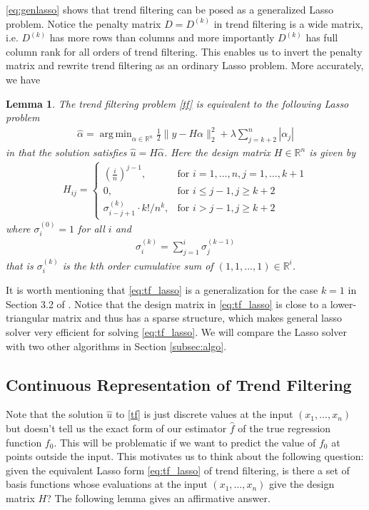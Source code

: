 \documentclass[a4paper]{article}
\DeclareMathOperator*{\argmin}{arg\,min}
\newtheorem{lemma}[theorem]{Lemma}
\newcommand{\RR}{\mathbb{R}}
\begin{document}
\eqref{eq:genlasso} shows that trend filtering can be posed as a generalized Lasso problem. Notice the penalty matrix $D=D^{(k)}$ in trend filtering is a wide matrix, i.e. $D^{(k)}$ has more rows than columns and more importantly $D^{(k)}$ has full column rank for all orders of trend filtering. This enables us to invert the penalty matrix and rewrite trend filtering as an ordinary Lasso problem. More accurately, we have

\begin{lemma}
The trend filtering problem \eqref{tf} is equivalent to the following Lasso problem
\begin{align}
\hat{\alpha} = \argmin_{\alpha\in\RR^n}\frac{1}{2}\|y-H\alpha\|_2^2 + \lambda\sum_{j=k+2}^n |\alpha_j|
\label{eq:tf_lasso}
\end{align}
in that the solution satisfies $\hat{u} = H\hat{\alpha}$. Here the design matrix $H\in\RR^n$ is given by
\begin{align}
H_{ij} = 
\begin{cases}
(\frac{i}{n})^{j-1}, & \text{for } i = 1,\ldots, n, j=1,\ldots, k+1\\
0, & \text{for } i \leq j-1, j\geq k+2\\
\sigma_{i-j+1}^{(k)} \cdot k!/n^k, &\text{for } i > j-1, j\geq k+2
\end{cases}
\label{Hcumsum}
\end{align}
where $\sigma_i^{(0)} = 1$ for all $i$ and
\begin{align*}
\sigma^{(k)}_i = \sum_{j=1}^i \sigma_j^{(k-1)}
\end{align*}
that is $\sigma_i^{(k)}$ is the $k$th order cumulative sum of $(1,1,\ldots, 1)\in\RR^i$.
\end{lemma}
It is worth mentioning that \eqref{eq:tf_lasso} is a generalization for the case $k =1$ in Section 3.2 of \cite{kim2009ell_1}. Notice that the design matrix in \eqref{eq:tf_lasso} is close to a lower-triangular matrix and thus has a sparse structure, which makes general lasso solver very efficient for solving \eqref{eq:tf_lasso}. We will compare the Lasso solver with two other algorithms in Section \ref{subsec:algo}. 
\subsection{Continuous Representation of Trend Filtering}
Note that the solution $\hat{u}$ to \eqref{tf} is just discrete values at the input $(x_1,\ldots, x_n)$ but doesn't tell us the exact form of our estimator $\hat{f}$ of the true regression function $f_0$. This will be problematic if we want to predict the value of $f_0$ at points outside the input. This motivates us to think about the following question: given the equivalent Lasso form \eqref{eq:tf_lasso} of trend filtering, is there a set of basis functions whose evaluations at the input $(x_1,\ldots, x_n)$ give the design matrix $H$? The following lemma gives an affirmative answer.
\end{document}
